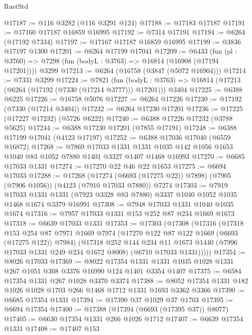 \begin{lexlean}{RustStd}
\begin{coremodule}
@17187 := @116 @3282 (@116 @3291 @124)
@17188 := @17183 @17187
@17191 := @17160 @17187 @16859 @16995
@17192 := @7314 @17191
@17194 := @6264 (@17192 @7334)
@17197 := @17167 @17187 @16859 @16995
@17199 := @3836 @17197 @1300
@17201 := @6264 @17199 @17041
@17209 := @6433
    (fun (pl : @3760) => @7298 (fun (bodyL : @3763) => @16814 (@16908 (@17194 @17201))))
    @3299
@17213 := @6264 (@16758 (@3847 (@5072 @16904)))
@17214 := @7331 @3299
@17224 := @7821
    (fun (bodyL : @3763) => @16814 (@17213 (@6264 (@17192 (@7330 (@17214 @3777))) @17201)))
    @3404
@17225 := @6388 @6225
@17226 := @16758 @5076
@17227 := @6264 @17226
@17230 := @17192 (@7330 (@17214 @3404))
@17232 := @6264 @17230 @17201
@17236 := @17225 (@17227 @17232) (@5726 @6222)
@17240 := @6388 @17226 @17232 (@3788 @5625)
@17244 := @6388 @17230 @17201 (@7855 @17191)
@17248 := @6388 @17199 @17041 (@4123 @17197)
@17252 := @6388 @17036 @17040 (@6559 @16872)
@17268 := @7869
    @17033
    @1331
    @1331
    @1035
    @142
    @1056
    @1653
    @1040
    @83
    @1052
    @7880
    @1401
    @3327
    @1407
    @1468
    @16993
@17270 := @6685 @17033 @1331
@17274 := @17270 @22 @46 @22 @1653
@17275 := @6694 @17033
@17288 := @17268
    (@17274 (@6693 (@17275 @22)) @7898)
    (@7905 (@7906 @1056))
    (@4123 (@7910 @17033 @7880))
    @7274
@17303 := @7919
    @17033
    @1331
    @1331
    (@7923 @3328 @83 @7880)
    @3337
    @1040
    @1052
    @1035
    @1468
    @1674
    @3379
    @16991
@17308 := @7948 @17033 @1331 @1040 @1035 @1674
@17316 := @7957 @17033 @1331 @153 @252 @87 @234 @1669 @1673
@17318 := @6639 @17033 @1331
@17353 := @17303
    (@17308
      (@17316
        (@17318
          @153
          @254
          @87
          @7971
          @1669
          @7974
          (@17270 @122 @87 @122 @1669 (@6693 (@17275 @122)) @7984)
          (@17318
            @252
            @144
            @234
            @11
            @1673
            @1440
            (@7996 @17033 @1331 @249 @234 @1672 @8008)
            (@6710 @17033 @1331)))))
@17354 := @8026 @17033
@17369 := @8022
    @17354
    @1331
    @1331
    @1035
    @1028
    @1331
    @267
    @1051
    @308
    @3376
    @16990
    @124
    @1401
    @3354
    @1407
@17375 := @6584 @17354 @1331 @267 @1028 @3370 @3374
@17388 := @8052 @17354 @1331 @182 @1026 @1028 @1703 @266 @1468 @1712 @1331 @1693 @3362 @3366
@17390 := @6685 @17354 @1331
@17394 := @17390 @37 @1029 @37 @1703
@17395 := @6694 @17354
@17400 := @17388 (@17394 (@6693 (@17395 @37)) @8077)
@17405 := @6630 @17354 @1331 @266 @1026 @1712
@17407 := @6639 @17354 @1331
@17408 := @17407 @153

\end{coremodule}
\end{lexlean}
